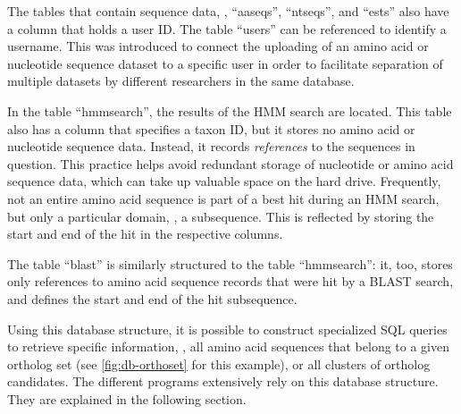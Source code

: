 The tables that contain sequence data, \ie, ``aaseqs'', ``ntseqs'', and ``ests''
also have a column that holds a user ID. The table ``users'' can be referenced
to identify a username. This was introduced to connect the uploading of an amino
acid or nucleotide sequence dataset to a specific user in order to facilitate
separation of multiple datasets by different researchers in the same database.

In the table ``hmmsearch'', the results of the HMM search are located. This
table also has a column that specifies a taxon ID, but it stores no amino acid
or nucleotide sequence data. Instead, it records \emph{references} to the
sequences in question. This practice helps avoid redundant storage of nucleotide
or amino acid sequence data, which can take up valuable space on the hard drive.
Frequently, not an entire amino acid sequence is part of a best hit during an HMM
search, but only a particular domain, \ie, a subsequence. This is reflected by
storing the start and end of the hit in the respective columns. 

The table ``blast'' is similarly structured to the table ``hmmsearch'': it, too,
stores only references to amino acid sequence records that were hit by a BLAST
search, and defines the start and end of the hit subsequence.

Using this database structure, it is possible to construct specialized SQL
queries to retrieve specific information, \eg, all amino acid sequences that
belong to a given ortholog set (see \autoref{fig:db-orthoset} for this example),
or all clusters of ortholog candidates. The different \pname programs
extensively rely on this database structure. They are explained in the following
section.




